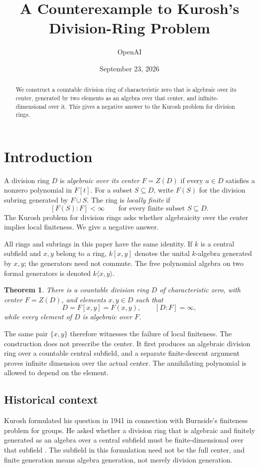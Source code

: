 \documentclass[11pt]{article}
\title{A Counterexample to Kurosh's Division-Ring Problem}
\author{OpenAI}
\date{September 23, 2026}
\newtheorem{theorem}{Theorem}[section]
\theoremstyle{definition}
\theoremstyle{remark}
\numberwithin{equation}{section}
\begin{document}
\begin{abstract}
We construct a countable division ring of characteristic zero that is
algebraic over its center, generated by two elements as an algebra over
that center, and infinite-dimensional over it. This gives a negative
answer to the Kurosh problem for division rings.
\end{abstract}
\setcounter{tocdepth}{1}
\tableofcontents
 
\section{Introduction}\label{sec:introduction}

A division ring $D$ is \emph{algebraic over its center} $F=Z(D)$ if every
$a\in D$ satisfies a nonzero polynomial in $F[t]$. For a subset $S\subseteq D$,
write $F(S)$ for the division subring generated by $F\cup S$.
The ring is \emph{locally finite} if
\[
 [F(S):F]<\infty\qquad\text{for every finite subset }S\subseteq D.
\]
The Kurosh problem for division rings asks whether algebraicity over the
center implies local finiteness. We give a negative answer.

All rings and subrings in this paper have the same identity. If $k$ is a
central subfield and $x,y$ belong to a ring, $k[x,y]$ denotes the unital
$k$-algebra generated by $x,y$; the generators need not commute.
The free polynomial algebra on two formal generators is denoted
$k\langle x,y\rangle$.

\begin{theorem}\label{thm:main}
There is a countable division ring $D$ of characteristic zero, with
center $F=Z(D)$, and elements $x,y\in D$ such that
\[
 D=F[x,y]=F(x,y),\qquad [D:F]=\infty,
\]
while every element of $D$ is algebraic over $F$.
\end{theorem}

The same pair $\{x,y\}$ therefore witnesses the failure of local finiteness.
The construction does not prescribe the center. It first produces an
algebraic division ring over a countable central subfield, and a separate
finite-descent argument proves infinite dimension over the actual center.
The annihilating polynomial is allowed to depend on the element.

\subsection{Historical context}

Kurosh formulated his question in 1941 in connection with Burnside's
finiteness problem for groups. He asked whether a division ring that is
algebraic and finitely generated as an algebra over a central subfield
must be finite-dimensional over that subfield
\cite[Problem~(K), p.~240]{Kurosh1941}. The subfield in this formulation
need not be the full center, and finite generation means algebra
generation, not merely division generation.
\end{document}
